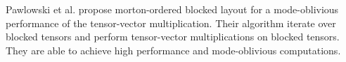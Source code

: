 Pawlowski et al. \cite{pawlowski:2019:morton.tensor.computations} propose morton-ordered blocked layout for a mode-oblivious performance of the tensor-vector multiplication.
Their algorithm iterate over blocked tensors and perform tensor-vector multiplications on blocked tensors.
They are able to achieve high performance and mode-oblivious computations.


